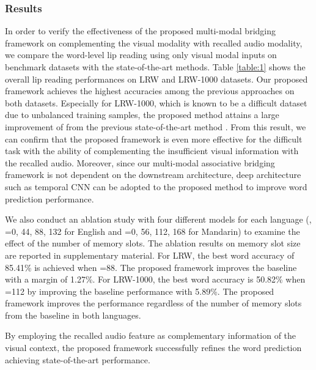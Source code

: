 \documentclass[10pt,twocolumn,letterpaper]{article}
\begin{document}
\vspace{-0.3cm}
\subsubsection{Results}
In order to verify the effectiveness of the proposed multi-modal bridging framework on complementing the visual modality with recalled audio modality, we compare the word-level lip reading using only visual modal inputs on benchmark datasets with the state-of-the-art methods. 
Table \ref{table:1} shows the overall lip reading performances on LRW and LRW-1000 datasets. Our proposed framework achieves the highest accuracies among the previous approaches on both datasets. Especially for LRW-1000, which is known to be a difficult dataset due to unbalanced training samples, the proposed method attains a large improvement of  from the previous state-of-the-art method \cite{zhang2020cutout}. From this result, we can confirm that the proposed framework is even more effective for the difficult task with the ability of complementing the insufficient visual information with the recalled audio. Moreover, since our multi-modal associative bridging framework is not dependent on the downstream architecture, deep architecture such as temporal CNN can be adopted to the proposed method to improve word prediction performance.

We also conduct an ablation study with four different models for each language (\ie, =0, 44, 88, 132 for English and =0, 56, 112, 168 for Mandarin) to examine the effect of the number of memory slots. The ablation results on memory slot size are reported in supplementary material. For LRW, the best word accuracy of 85.41\% is achieved when =88. The proposed framework improves the baseline with a margin of 1.27\%. For LRW-1000, the best word accuracy is 50.82\% when =112 by improving the baseline performance with 5.89\%. 
The proposed framework improves the performance regardless of the number of memory slots from the baseline in both languages.

By employing the recalled audio feature as complementary information of the visual context, the proposed framework successfully refines the word prediction achieving state-of-the-art performance.
\end{document}

